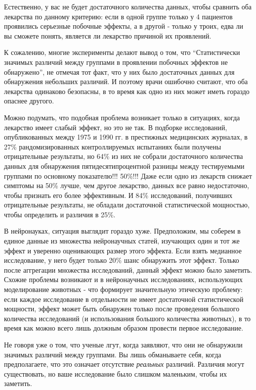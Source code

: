 Естественно, у вас не будет достаточного количества данных, чтобы сравнить оба лекарства по данному критерию: если в одной группе только у 4 пациентов проявились серьезные побочные эффекты, а в другой - только у троих, едва ли вы сможете понять, является ли лекарство причиной их проявлений.


К сожалению, многие эксперименты делают вывод о том, что ``Статистически значимых различий между группами в проявлении побочных эффектов не обнаружено'', не отмечая тот факт, что у них было достаточных данных для обнаружения небольших различий.\cite{tsang_inadequate_2009} И поэтому врачи ошибочно считают, что оба лекарства одинаково безопасны, в то время как одно из них может иметь гораздо опаснее другого.

Можно подумать, что подобная проблема возникает только в ситуациях, когда лекарство имеет слабый эффект, но это не так. В подборке исследований, опубликованных между 1975 и 1990 гг. в престижных медицинских журналах, в 27\% рандомизированных контроллируемых испытаниях были получены отрицательные результаты, но 64\% из них не собрали достаточного количества данных для обнаружения пятидесятипроцентной разницы между тестируемыми группами по основному показателю!!! 50\%!!! Даже если одно из лекарств снижает симптомы на 50\% лучше, чем другое лекарство, данных все равно недостаточно, чтобы признать его более эффективным. И 84\% исследований, получивших отрицательные результаты, не обладали достаточной статистической мощностью, чтобы определить и различия в 25\%. \cite{moher_statistical_1994,bedard_statistical_2007,brown_1987,chung_1998}

В нейронауках, ситуация выглядит гораздо хуже. Предположим, мы соберем в единое данные из множества нейронаучных статей, изучающих один и тот же эффект и уверенно оценивающих размер этого эффекта. Если взять медианное исследование, у него будет только 20\% шанс обнаружить этот эффект. Только после аггрегации множества исследований, данный эффект можно было заметить. Схожие проблемы возникают и в нейронаучных исследованиях, использующих моделирование животных - что формирует значительную этическую проблему: если каждое исследование в отдельности не имеет достаточной статистической мощности, эффект может быть обнаружен только после проведения большого количества исследований (и использования большого количества животных), в то время как можно всего лишь должным образом провести первое исследование.\cite{button_power_2013}

Не говоря уже о том, что ученые лгут, когда заявляют, что они не обнаружили значимых различий между группами. Вы лишь обманываете себя, когда предполагаете, что это означает отсутствие \emph{реальных} различий. Различия могут существовать, но ваше исследование было слишком маленьким, чтобы их заметить.

